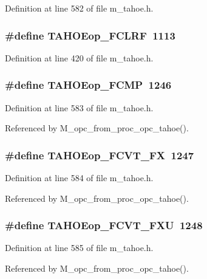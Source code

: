 Definition at line 582 of file m\_\-tahoe.h.
\subsubsection{\setlength{\rightskip}{0pt plus 5cm}\#define TAHOEop\_\-FCLRF~1113}\label{m__tahoe_8h_5e1241092832fb93c20ffadf247d05a0}




Definition at line 420 of file m\_\-tahoe.h.
\subsubsection{\setlength{\rightskip}{0pt plus 5cm}\#define TAHOEop\_\-FCMP~1246}\label{m__tahoe_8h_8a46daf0e16ae0216426d1fc114ab14b}




Definition at line 583 of file m\_\-tahoe.h.

Referenced by M\_\-opc\_\-from\_\-proc\_\-opc\_\-tahoe().
\subsubsection{\setlength{\rightskip}{0pt plus 5cm}\#define TAHOEop\_\-FCVT\_\-FX~1247}\label{m__tahoe_8h_d21915bc4fbe2373d790a0aaa83b2134}




Definition at line 584 of file m\_\-tahoe.h.

Referenced by M\_\-opc\_\-from\_\-proc\_\-opc\_\-tahoe().
\subsubsection{\setlength{\rightskip}{0pt plus 5cm}\#define TAHOEop\_\-FCVT\_\-FXU~1248}\label{m__tahoe_8h_10905263b8ed898c10788c233dcbbafc}




Definition at line 585 of file m\_\-tahoe.h.

Referenced by M\_\-opc\_\-from\_\-proc\_\-opc\_\-tahoe().
